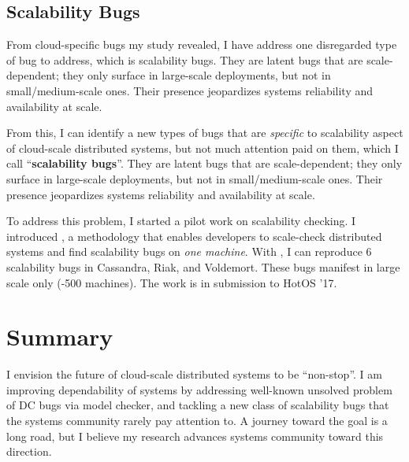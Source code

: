\documentclass[11pt]{article}
\begin{document}
\subsection{Scalability Bugs}

From cloud-specific bugs my study revealed, I have address one disregarded type
of bug to address, which is scalability bugs. They are latent bugs that are
scale-dependent; they only surface in large-scale deployments, but not in
small/medium-scale ones. Their presence jeopardizes systems reliability and
availability at scale. 

From this, I can identify a new types of bugs that are \textit{specific} to
scalability aspect of cloud-scale distributed systems, but not much attention
paid on them, which I call ``\textbf{scalability bugs}''. They are latent bugs
that are scale-dependent; they only surface in large-scale deployments, but not
in small/medium-scale ones. Their presence jeopardizes systems reliability and
availability at scale. 
\fi 

To address this problem, I started a pilot work on scalability checking. I
introduced \sck, a methodology that enables developers to scale-check
distributed systems and find scalability bugs on \textit{one machine}. With
\sck, I can reproduce 6 scalability bugs in Cassandra, Riak, and Voldemort.
These bugs manifest in large scale only (-500 machines).  The work is in
submission to HotOS '17.

\section{Summary}

I envision the future of cloud-scale distributed systems to be ``non-stop''. I
am improving dependability of systems by addressing well-known unsolved problem
of DC bugs via model checker, and tackling a new class of scalability bugs that
the systems community rarely pay attention to. A journey toward the goal is a
long road, but I believe my research advances systems community toward this
direction. 


\end{document}

